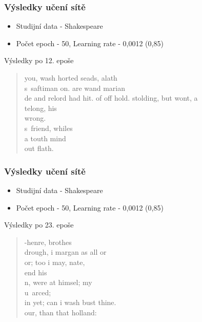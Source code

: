 \documentclass{beamer}
\begin{document}
	\begin{frame}
	\frametitle{Výsledky učení sítě}
		\begin{itemize}
			\item Studijní data - Shakespeare
			\item Počet epoch - 50, Learning rate - 0,0012 (0,85)
		\end{itemize}
		\begin{block}{Výsledky po 12. epoše}
			\begin{quote}
				you, wash horted seads, alath\\
				s~saftiman on. are wand marian\\
				de and relord had hit. of off hold. stolding, but wont, a\\
				telong, his\\
				wrong.\\
				s~friend, whiles\\
				a touth mind\\
				out flath. \\
			\end{quote}
		\end{block}
	\end{frame}

	\begin{frame}
	\frametitle{Výsledky učení sítě}
		\begin{itemize}
			\item Studijní data - Shakespeare
			\item Počet epoch - 50, Learning rate - 0,0012 (0,85)
		\end{itemize}
		\begin{block}{Výsledky po 23. epoše}
			\begin{quote}
				-henre, brothes\\
				drough, i margan as all or\\
				or; too i may, nate,\\
				end his\\
				n, were at himsel; my\\
				u~arced;\\
			        in yet; can i wash bust thine.\\
				our, than that holland:\\
			\end{quote}
		\end{block}
	\end{frame}


\end{document}
